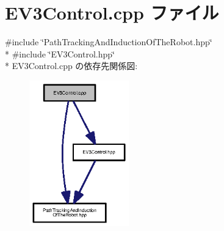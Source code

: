 \section{E\-V3\-Control.\-cpp ファイル}
\label{_e_v3_control_8cpp}
{\ttfamily \#include \char`\"{}Path\-Tracking\-And\-Induction\-Of\-The\-Robot.\-hpp\char`\"{}}\\*
{\ttfamily \#include \char`\"{}E\-V3\-Control.\-hpp\char`\"{}}\\*
E\-V3\-Control.\-cpp の依存先関係図\-:\nopagebreak
\begin{figure}[H]
\begin{center}
\leavevmode
\includegraphics[width=122pt]{_e_v3_control_8cpp__incl}
\end{center}
\end{figure}
